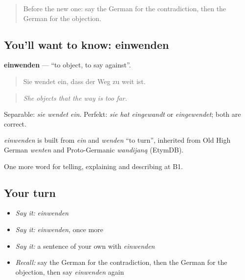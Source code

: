 \label{lesson:GE-C333-einwenden}



\begin{quote}
Before the new one: say the German for the contradiction, then the German for the objection.
\end{quote}

\subsection*{You'll want to know: einwenden}
\textbf{einwenden} — \textquotedblleft{}to object, to say against\textquotedblright{}.

\begin{quote}
Sie wendet ein, dass der Weg zu weit ist.
\end{quote}

\begin{quote}
\emph{She objects that the way is too far.}
\end{quote}

Separable: \emph{sie wendet ein}. Perfekt: \emph{sie hat eingewandt} or \emph{eingewendet}; both are correct.

\begin{cousinweb}
\emph{einwenden} is built from \emph{ein} and \emph{wenden} \textquotedblleft{}to turn\textquotedblright{}, inherited from Old High German \emph{wenten} and Proto-Germanic \emph{wandijaną} (EtymDB).
\end{cousinweb}

\begin{grammarlens}[title={What you've built}]
One more word for telling, explaining and describing at B1.
\end{grammarlens}

\subsection*{Your turn}
\begin{itemize}
\raggedright
  \item \emph{Say it:} \emph{einwenden}
  \item \emph{Say it:} \emph{einwenden}, once more
  \item \emph{Say it:} a sentence of your own with \emph{einwenden}
  \item \emph{Recall:} say the German for the contradiction, then the German for the objection, then say \emph{einwenden} again
\end{itemize}

